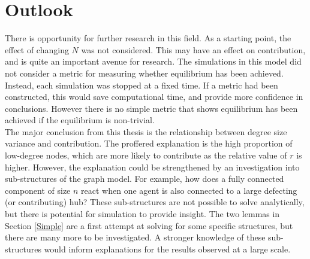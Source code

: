 \section{Outlook}
There is opportunity for further research in this field. As a starting point, the effect of changing $N$ was not considered. This may have an effect on contribution, and is quite an important avenue for research. The simulations in this model did not consider a metric for measuring whether equilibrium has been achieved. Instead, each simulation was stopped at a fixed time. If a metric had been constructed, this would save computational time, and provide more confidence in conclusions. However there is no simple metric that shows equilibrium has been achieved if the equilibrium is non-trivial. \\

The major conclusion from this thesis is the relationship between degree size variance and contribution. The proffered explanation is the high proportion of low-degree nodes, which are more likely to contribute as the relative value of $r$ is higher. However, the explanation could be strengthened by an investigation into sub-structures of the graph model. For example, how does a fully connected component of size $n$ react when one agent is also connected to a large defecting (or contributing) hub? These sub-structures are not possible to solve analytically, but there is potential for simulation to provide insight. The two lemmas in Section \ref{Simple} are a first attempt at solving for some specific structures, but there are many more to be investigated. A stronger knowledge of these sub-structures would inform explanations for the results observed at a large scale. \\




